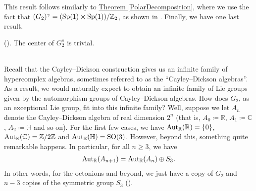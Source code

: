 \noindent This result follows similarly to \hyperref[PolarDecomposition]{Theorem \ref*{PolarDecomposition}}, where we use the fact that $(G_2)^\gamma = (\textup{Sp}(1) \times \textup{Sp}(1))/\mathbb{Z}_2$, as shown in \cite[Theorem 1.10.1]{Yok25}. Finally, we have one last result.\\

\noindent\begin{theorem}\textup{(\cite[Theorem 1.13.2]{Yok25}).} The center of $G_2^s$ is trivial.\\
\end{theorem}

\newpage
\renewcommand\thesection{A}
\noindent\\ Recall that the Cayley--Dickson construction gives us an infinite family of hypercomplex algebras, sometimes referred to as the ``Cayley--Dickson algebras''. As a result, we would naturally expect to obtain an infinite family of Lie groups given by the automorphism groups of Cayley--Dickson algebras. How does $G_2$, as an exceptional Lie group, fit into this infinite family? Well, suppose we let $A_n$ denote the Cayley--Dickson algebra of real dimension $2^n$ (that is, $A_0 \coloneqq \mathbb{R}$, $A_1 \coloneqq \mathbb{C}$, $A_2 \coloneqq \mathbb{H}$ and so on). For the first few cases, we have $\textup{Aut}_\mathbb{R}(\mathbb{R}) = \{0\}$, $\textup{Aut}_\mathbb{R}(\mathbb{C}) = \mathbb{Z}/2\mathbb{Z}$ and $\textup{Aut}_\mathbb{R}(\mathbb{H}) = \textup{SO}(3)$. However, beyond this, something quite remarkable happens. In particular, for all $n \geq 3$, we have
\begin{align*}
\begin{split}
\textup{Aut}_\mathbb{R}(A_{n+1}) = \textup{Aut}_\mathbb{R}(A_n) \oplus S_3.
\end{split}
\end{align*}
\noindent In other words, for the octonions and beyond, we just have a copy of $G_2$ and $n-3$ copies of the symmetric group $S_3$ (\cite{ES90}).

\newpage
\renewcommand\thesection{R}
\begingroup
\setlength{\emergencystretch}{.5em}
\printbibliography[heading=none]
\endgroup


